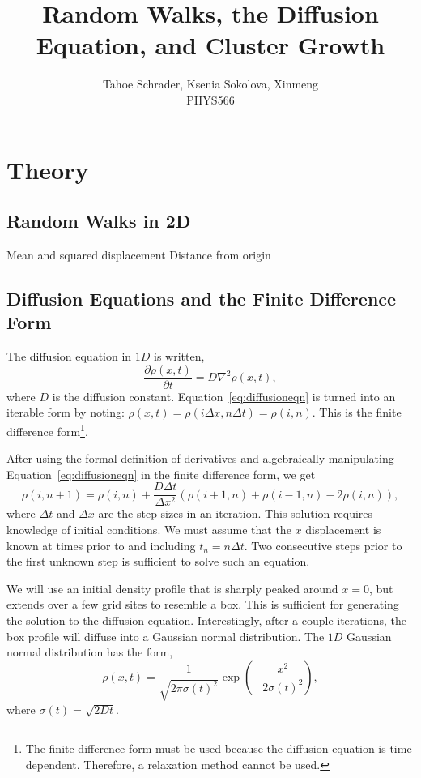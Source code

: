 \documentclass[10pt]{article}
\title{Random Walks, the Diffusion Equation, and Cluster Growth}
\author{Tahoe Schrader, Ksenia Sokolova, Xinmeng \\PHYS566}
\date{}
\begin{document}
\maketitle


\section{Theory}
\label{sec:theory}

\subsection{Random Walks in 2D}
Mean and squared displacement
Distance from origin

\subsection{Diffusion Equations and the Finite Difference Form}
\label{sec:diffusionequation}
The diffusion equation in $1D$ is written,
\begin{equation}
  \label{eq:diffusioneqn}
  \frac{\partial\rho(x,t)}{\partial t} = D\nabla^2\rho(x,t),
\end{equation}
where $D$ is the diffusion constant. Equation~\ref{eq:diffusioneqn} is turned into an iterable form by noting: $\rho(x,t) = \rho(i\Delta x, n\Delta t) = \rho(i,n)$. This is the finite difference form\footnote{The finite difference form must be used because the diffusion equation is time dependent. Therefore, a relaxation method cannot be used.}.

After using the formal definition of derivatives and algebraically manipulating Equation~\ref{eq:diffusioneqn} in the finite difference form, we get
\begin{equation}
  \label{eq:diffusioneqn-iterable}
  \rho(i,n+1) = \rho(i,n) + \frac{D\Delta t}{\Delta x^2}\left(\rho(i+1,n) + \rho(i-1,n) - 2\rho(i,n)\right),
\end{equation}
where $\Delta t$ and $\Delta x$ are the step sizes in an iteration. This solution requires knowledge of initial conditions. We must assume that the $x$ displacement is known at times prior to and including $t_n = n\Delta t$. Two consecutive steps prior to the first unknown step is sufficient to solve such an equation.

We will use an initial density profile that is sharply peaked around $x=0$, but extends over a few grid sites to resemble a box. This is sufficient for generating the solution to the diffusion equation. Interestingly, after a couple iterations, the box profile will diffuse into a Gaussian normal distribution. The $1D$ Gaussian normal distribution has the form,
\begin{equation}
  \label{eq:gaussiandistribution}
  \rho(x,t) = \frac{1}{\sqrt{2\pi\sigma(t)^2}}\exp\left(-\frac{x^2}{2\sigma(t)^2}\right),
\end{equation}
where $\sigma(t) = \sqrt{2Dt}$.
\end{document}
